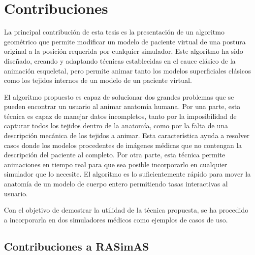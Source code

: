 \section{Contribuciones}
\label{intro:contribuciones}

La principal contribución de esta tesis es la presentación de un algoritmo geométrico que permite modificar un modelo de paciente virtual de una postura original a la posición requerida por cualquier simulador. Este algoritmo ha sido diseñado, creando y adaptando técnicas establecidas en el cauce clásico de la animación esqueletal, pero permite animar tanto los modelos superficiales clásicos como los tejidos internos de un modelo de un paciente virtual.

El algoritmo propuesto es capaz de solucionar dos grandes problemas que se pueden encontrar un usuario al animar anatomía humana. Por una parte, esta técnica es capaz de manejar datos incompletos, tanto por la imposibilidad de capturar todos los tejidos dentro de la anatomía, %
como por la falta de una descripción mecánica de los tejidos a animar. Esta característica ayuda a resolver casos donde los modelos procedentes de imágenes médicas %
que no contengan la descripción del paciente al completo. Por otra parte, esta técnica permite animaciones en tiempo real para que sea posible incorporarlo en cualquier simulador que lo necesite. El algoritmo es lo suficientemente rápido para mover la anatomía de un modelo de cuerpo entero permitiendo tasas interactivas al usuario.

Con el objetivo de demostrar la utilidad de la técnica propuesta, se ha procedido a incorporarla en dos simuladores médicos como ejemplos de casos de uso. 

\subsection{Contribuciones a RASimAS}



